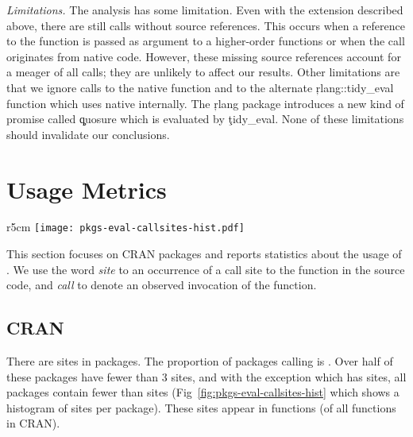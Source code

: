 \documentclass[review,nonacm,screen,acmsmall,anonymous=true]{acmart}
\newcommand{\mypara}[1]{\medskip\noindent\emph{#1}\xspace}
\begin{document}
\mypara{Limitations.} The analysis has some limitation. Even with the extension
described above, there are still \PkgUndefinedRnd \eval calls without source
references. This occurs when a reference to the \eval function is passed as
argument to a higher-order functions or when the \eval call originates from
native code. However, these missing source references account for a meager
\PkgUndefinedRatio of all calls; they are unlikely to affect our results. Other
limitations are that we ignore calls to the native \eval function and to the
alternate \c{rlang::tidy\_eval} function which uses native \eval internally.
The \c{rlang} package introduces a new kind of promise called \c{quosure} which
is evaluated by \c{tidy\_eval}. None of these limitations should invalidate our
conclusions.

\newpage

\section{Usage Metrics}

\begin{wrapfigure}{r}{5cm} \hspace*{-12mm}
  \centering
  \texttt{[image: pkgs-eval-callsites-hist.pdf]} \caption{CRAN
  \eval call sites}%
  \label{fig:pkgs-eval-callsites-hist}
\end{wrapfigure}
%
This section focuses on CRAN packages and reports statistics about the usage of
\eval. We use the word \emph{site} to an occurrence of a call site to the \eval
function in the source code, and \emph{call} to denote an observed invocation of
the \eval function.

\subsection{CRAN}

There are \PkgEvalCallSites \eval sites in \PkgPackages packages. The proportion
of packages calling \eval is \PkgPackagesRatio. Over half of these packages
have fewer than 3 sites, and with the exception \MaxEvalCallSitesPackage which
has \MaxEvalCallSitesCount sites, all packages contain fewer than
\MaxEvalCallSitesRest sites (\cf Fig~\ref{fig:pkgs-eval-callsites-hist} which
shows a histogram of sites per package). These sites appear in \PkgFunsWithEval
functions (\CranFunsWithEvalRatio of all functions in CRAN).
\end{document}

